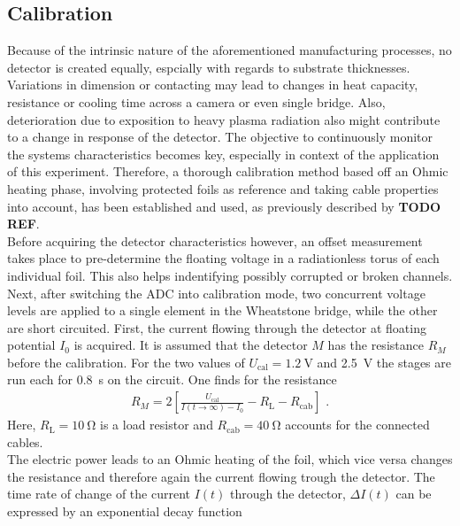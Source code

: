 \documentclass[
    aps,%
    twocolumn,%
    secnumarabic,%
    amssymb,%
    prd,%
    10pt%
    ]{revtex4-1}
\newcommand{\ix}[1]{_\text{#1}}
\begin{document}
    \subsection{Calibration}\label{subsec:calibration}
    Because of the intrinsic nature of the aforementioned manufacturing processes, no detector is created equally, espcially with regards to substrate thicknesses. Variations in dimension or contacting may lead to changes in heat capacity, resistance or cooling time across a camera or even single bridge. Also, deterioration due to exposition to heavy plasma radiation also might contribute to a change in response of the detector. The objective to continuously monitor the systems characteristics becomes key, especially in context of the application of this experiment. Therefore, a thorough calibration method based off an Ohmic heating phase, involving protected foils as reference and taking cable properties into account, has been established and used, as previously described by \textbf{TODO REF}.\\%
    Before acquiring the detector characteristics however, an offset measurement takes place to pre-determine the floating voltage in a radiationless torus of each individual foil. This also helps indentifying possibly corrupted or broken channels.\\%
    Next, after switching the ADC into calibration mode, two concurrent voltage levels are applied to a single element in the Wheatstone bridge, while the other are short circuited. First, the current flowing through the detector at floating potential $I_{0}$ is acquired. It is assumed that the detector $M$ has the resistance $R_{M}$ before the calibration. For the two values of \mbox{$U\ix{cal}=\SI{1.2}{\volt}$} and \mbox{\SI{2.5}{\volt}} the stages are run each for \mbox{\SI{0.8}{\second}} on the circuit. One finds for the resistance%
    \begin{align}
        R_{M}=2\left[\frac{U\ix{cal}}%
            {I\left(t\rightarrow\infty\right)-I_{0}}%
                -R\ix{L}-R\ix{cab}\right]\,\,.%
    \end{align}
    Here, \mbox{$R\ix{L}=\SI{10}{\ohm}$} is a load resistor and \mbox{$R\ix{cab}=\SI{40}{\ohm}$} accounts for the connected cables.\\%
    The electric power leads to an Ohmic heating of the foil, which vice versa changes the resistance and therefore again the current flowing trough the detector. The time rate of change of the current \mbox{$I\left(t\right)$} through the detector, \mbox{$\Delta I\left(t\right)$} can be expressed by an exponential decay function%
\end{document}
